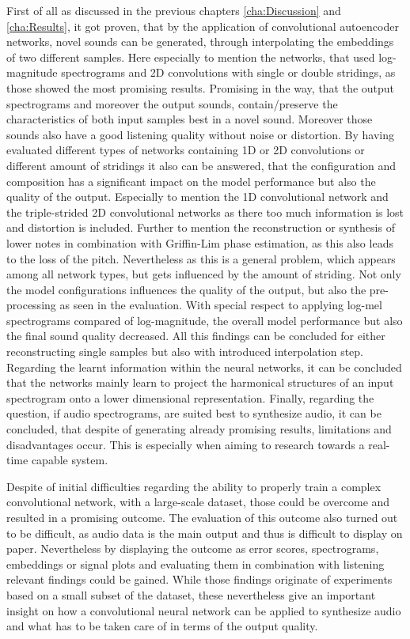 First of all as discussed in the previous chapters \ref{cha:Discussion} and \ref{cha:Results}, it got proven, that by the application of convolutional autoencoder networks, novel sounds can be generated, through interpolating the embeddings of two different samples. Here especially to mention the networks, that used log-magnitude spectrograms and 2D convolutions with single or double stridings, as those showed the most promising results. Promising in the way, that the output spectrograms and moreover the output sounds, contain/preserve the characteristics of both input samples best in a novel sound. Moreover those sounds also have a good listening quality without noise or distortion. By having evaluated different types of networks containing 1D or 2D convolutions or different amount of stridings it also can be answered, that the configuration and composition has a significant impact on the model performance but also the quality of the output. Especially to mention the 1D convolutional network and the triple-strided 2D convolutional networks as there too much information is lost and distortion is included. Further to mention the reconstruction or synthesis of lower notes in combination with Griffin-Lim phase estimation, as this also leads to the loss of the pitch. Nevertheless as this is a general problem, which appears among all network types, but gets influenced by the amount of striding. Not only the model configurations influences the quality of the output, but also the pre-processing as seen in the evaluation. With special respect to applying log-mel spectrograms compared of log-magnitude, the overall model performance but also the final sound quality decreased. All this findings can be concluded for either reconstructing single samples but also with introduced interpolation step. Regarding the learnt information within the neural networks, it can be concluded that the networks mainly learn to project the harmonical structures of an input spectrogram onto a lower dimensional representation. Finally, regarding the question, if audio spectrograms, are suited best to synthesize audio, it can be concluded, that despite of generating already promising results, limitations and disadvantages occur. This is especially when aiming to research towards a real-time capable system. 

Despite of initial difficulties regarding the ability to properly train a complex convolutional network, with a large-scale dataset, those could be overcome and resulted in a promising outcome. The evaluation of this outcome also turned out to be difficult, as audio data is the main output and thus is difficult to display on paper. Nevertheless by displaying the outcome as error scores, spectrograms, embeddings or signal plots and evaluating them in combination with listening relevant findings could be gained. While those findings originate of experiments based on a small subset of the dataset, these nevertheless give an important insight on how a convolutional neural network can be applied to synthesize audio and what has to be taken care of in terms of the output quality.

